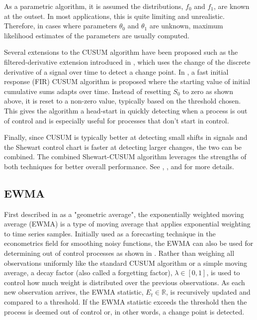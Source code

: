 As a parametric algorithm, it is assumed the distributions, $f_0$ and $f_1$, are known at the outset. In most applications, this is quite limiting and unrealistic. Therefore, in cases where parameters $\theta_0$ and $\theta_1$ are unknown, maximum likelihood estimates of the parameters are usually computed.

Several extensions to the CUSUM algorithm have been proposed such as the filtered-derivative extension introduced in \cite{basseville1981edge}, which uses the change of the discrete derivative of a signal over time to detect a change point. In \cite{lucas1982fast}, a fast initial response (FIR) CUSUM algorithm is proposed where the starting value of initial cumulative sums adapts over time. Instead of resetting $S_0$ to zero as shown above, it is reset to a non-zero value, typically based on the threshold chosen. This gives the algorithm a head-start in quickly detecting when a process is out of control and is especially useful for processes that don't start in control.

Finally, since CUSUM is typically better at detecting small shifts in signals and the Shewart control chart is faster at detecting larger changes, the two can be combined. The combined Shewart-CUSUM algorithm leverages the strengths of both techniques for better overall performance. See \cite{lucas1982combined}, \cite{yashchin1985analysis}, and \cite{westgard1977combined} for more details. 

\subsection{EWMA}
First described in \cite{roberts1959control} as a "geometric average", the exponentially weighted moving average (EWMA) is a type of moving average that applies exponential weighting to time series samples. Initially used as a forecasting technique in the econometrics field for smoothing noisy functions, the EWMA can also be used for determining out of control processes as shown in \cite{hunter1986exponentially}. Rather than weighing all observations uniformly like the standard CUSUM algorithm or a simple moving average, a decay factor (also called a  forgetting factor), $\lambda \in [0,1]$, is used to control how much weight is distributed over the previous observations. As each new observation arrives, the EWMA statistic, $E_t \in \mathbb{R}$, is recursively updated and compared to a threshold. If the EWMA statistic exceeds the threshold then the process is deemed out of control or, in other words, a change point is detected.

